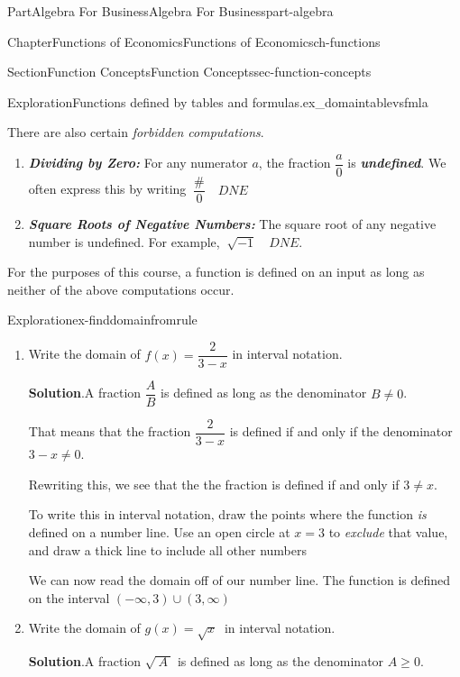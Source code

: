\documentclass{tufte-book}
\newcommand{\blocktitlefont}{\relax}
\newcommand{\alert}[1]{\textbf{\textit{#1}}}
\numberwithin{equation}{chapter}
\begin{document}
\begin{partptx}{Part}{Algebra For Business}{}{Algebra For Business}{}{}{part-algebra}
\begin{chapterptx}{Chapter}{Functions of Economics}{}{Functions of Economics}{}{}{ch-functions}
\begin{sectionptx}{Section}{Function Concepts}{}{Function Concepts}{}{}{sec-function-concepts}
\begin{exploration}{Exploration}{Functions defined by tables and formulas.}{ex_domaintablevsfmla}
\end{exploration}%
There are also certain \emph{forbidden computations}.%
\begin{enumerate}
\item{}\alert{Dividing by Zero:} For any numerator \(a\), the fraction \(\dfrac{a}{0}\) is \alert{undefined}.  We often express this by writing \(\ \dfrac{\#}{0} \quad DNE\)%
\item{}\alert{Square Roots of Negative Numbers:} The square root of any negative number is undefined. For example, \(\ \sqrt{-1}\quad DNE\).%
\end{enumerate}
For the purposes of this course, a function is defined on an input as long as neither of the above computations occur.%
\begin{exploration}{Exploration}{}{ex-finddomainfromrule}%
\begin{enumerate}[font=\bfseries,label=(\alph*),ref=\alph*]%
\item{}Write the domain of \(f(x) = \dfrac{2}{3-x}\) in interval notation.%
\par\smallskip%
\noindent\textbf{\blocktitlefont Solution}.\hypertarget{ex-finddomainfromrule-1-2}{}\quad{}A fraction \(\dfrac{A}{B}\) is defined as long as the denominator \(B\neq 0\).%
\par
That means that the fraction \(\dfrac{2}{3-x}\) is defined if and only if the denominator \(3-x \neq 0\).%
\par
Rewriting this, we see that the the fraction is defined if and only if \(3 \neq x\).%
\par
To write this in interval notation, draw the points where the function \emph{is} defined on a number line. Use an open circle at \(x=3\) to \emph{exclude} that value, and draw a thick line to include all other numbers%
\begin{image}{0.25}{0.5}{0.25}{}%
%
\end{image}%
We can now read the domain off of our number line. The function is defined on the interval \((-\infty,3)\cup(3,\infty)\)%
\item{}Write the domain of \(g(x) = \sqrt{x}\ \) in interval notation.%
\par\smallskip%
\noindent\textbf{\blocktitlefont Solution}.\hypertarget{ex-finddomainfromrule-2-2}{}\quad{}A fraction \(\sqrt{\ A\ }\) is defined as long as the denominator \(A\geq 0\).%

\end{enumerate}
\end{exploration}
\end{sectionptx}
\end{chapterptx}
\end{partptx}
\end{document}
